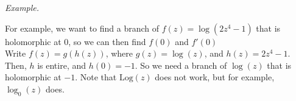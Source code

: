 \documentclass[10pt]{paper}
\newcommand{\gspc}{\vspace{0.13cm}} %
\newcommand{\gline}[0]{\gspc\\} %
\renewenvironment{example}{
  \begin{tcolorbox}[colback=gray!2, colframe=gray!40!white, coltitle=green!20!black, boxrule=3pt, sharp corners, breakable]
    \textit{Example.}
}{\end{tcolorbox}}
\begin{document}
\begin{example}
  For example, we want to find a branch of $f(z) = \log(2z^4 -1)$ that is holomorphic at 0, so we can then find $f(0)$ and $f'(0)$\gline{}
  Write $f(z) = g(h(z))$, where $g(z) = \log(z)$, and $h(z) = 2z^4 - 1$. Then, $h$ is entire, and $h(0) = -1$. So we need a branch of $\log(z)$ that is holomorphic at $-1$. Note that $\text{Log}(z)$ does not work, but for example, $\log_0(z)$ does. 
\end{example}
\end{document}
